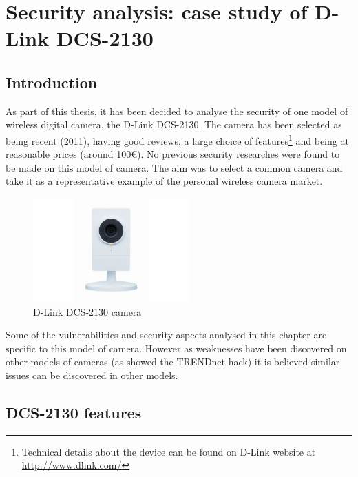 
\chapter{Security analysis: case study of D-Link DCS-2130}
\label{chap:cam-dcs}

\section*{Introduction}
\label{sec:dcs-intro}

% 

As part of this thesis, it has been decided to analyse the security of one model of wireless digital camera, the D-Link DCS-2130.
The camera has been selected as being recent (2011), having good reviews, a large choice of features\footnote{Technical details about the device can be found on D-Link website at \url{http://www.dlink.com/}} and being at reasonable prices (around 100€).
No previous security researches were found to be made on this model of camera.
The aim was to select a common camera and take it as a representative example of the personal wireless camera market.\\

\begin{figure}[h]
  \centering
  \includegraphics[width=6cm]{images/dcs2130.png}
  \caption{D-Link DCS-2130 camera}
  \label{fig:dcs2130}
\end{figure}

Some of the vulnerabilities and security aspects analysed in this chapter are specific to this model of camera.
However as weaknesses have been discovered on other models of cameras (as showed the TRENDnet hack) it is believed similar issues can be discovered in other models.\\

\section{DCS-2130 features}
\label{sec:dcs-pres}


